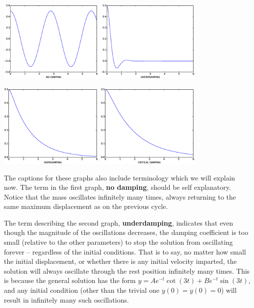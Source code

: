 \documentclass[12pt,letterpaper,twoside]{amsart}
\begin{document}
\begin{center}
\includegraphics[width=2in]{nodamping.eps}
\hspace{0.25in}
\includegraphics[width=2in]{underdamping.eps}

\includegraphics[width=2in]{overdamping.eps}
\hspace{0.25in}
\includegraphics[width=2in]{criticaldamping.eps}
\end{center}

The captions for these graphs also include terminology which we will explain now.  The term in the first graph, {\bf no damping}, should be self explanatory.  Notice that the mass oscillates infinitely many times, always returning to the same maximum displacement as on the previous cycle.

The term describing the second graph, {\bf underdamping}, indicates that even though the magnitude of the oscillations decreases, the damping coefficient is too small (relative to the other parameters) to stop the solution from oscillating forever -- regardless of the initial conditions.  That is to say, no matter how small the initial displacement, or whether there is any initial velocity imparted, the solution will always oscillate through the rest position infinitely many times.  This is because the general solution has the form $y=A e^{-t} \cot(3t)+B e^{-t} \sin(3t)$, and any initial condition (other than the trivial one $y(0)=\dot{y}(0)=0$) will result in infinitely many such oscillations.
\end{document}
